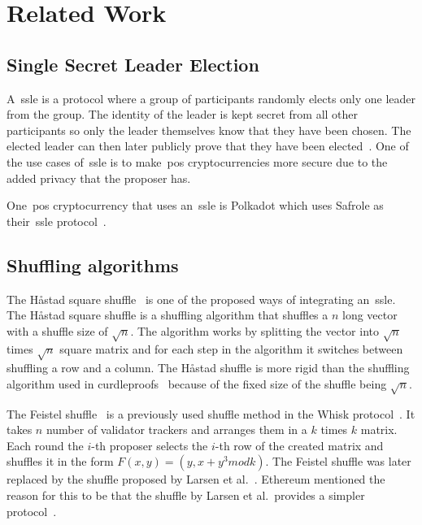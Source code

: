 \section{Related Work}\label{sec:related-work}




\subsection{Single Secret Leader Election}\label{sec:related-work-SSLE}
A~\gls{ssle} is a protocol where a group of participants randomly elects only one leader from the group.
The identity of the leader is kept secret from all other participants so only the leader themselves know that they have been chosen.
The elected leader can then later publicly prove that they have been elected~\cite{10.1145/3419614.3423258}.
One of the use cases of~\gls{ssle} is to make~\gls{pos} cryptocurrencies more secure due to the added privacy that the proposer has.

One~\gls{pos} cryptocurrency that uses an~\gls{ssle} is Polkadot which uses Safrole as their~\gls{ssle} protocol~\cite{safrole}.



\subsection{Shuffling algorithms}\label{subsec:related-work-shuffling-algorithm}

The Håstad square shuffle~\cite{haastad2006square} is one of the proposed ways of integrating an~\gls{ssle}.
The Håstad square shuffle is a shuffling algorithm that shuffles a $n$ long vector with a shuffle size of $\sqrt {n}$.
The algorithm works by splitting the vector into $\sqrt {n}$ times $\sqrt {n}$ square matrix and for each step in the algorithm it switches between shuffling a row and a column.
The Håstad shuffle is more rigid than the shuffling algorithm used in curdleproofs~\cite{cryptoeprint:2022/560} because of the fixed size of the shuffle being $\sqrt {n}$.

The Feistel shuffle~\cite{Feistle} is a previously used shuffle method in the Whisk protocol~\cite{Whisk2024}.
It takes $n$ number of validator trackers and arranges them in a $k$ times $k$ matrix.
Each round the $i$-th proposer selects the $i$-th row of the created matrix and shuffles it in the form $F(x,y)=(y,x+y^3 mod k)$.
The Feistel shuffle was later replaced by the shuffle proposed by Larsen et al.~\cite{cryptoeprint:2022/560}.
Ethereum mentioned the reason for this to be that the shuffle by Larsen et al.\ provides a simpler protocol~\cite{Whisk2024}.

